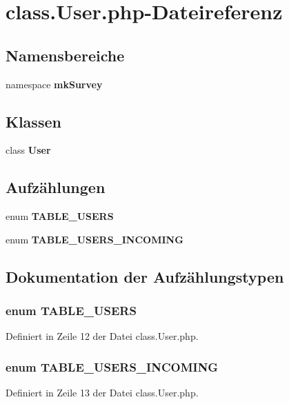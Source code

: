 \section{class.User.php-Dateireferenz}
\label{class_8User_8php}
\subsection*{Namensbereiche}
\begin{CompactItemize}
\item 
namespace {\bf mkSurvey}
\end{CompactItemize}
\subsection*{Klassen}
\begin{CompactItemize}
\item 
class {\bf User}
\end{CompactItemize}
\subsection*{Aufzählungen}
\begin{CompactItemize}
\item 
enum {\bf TABLE\_\-USERS} 
\item 
enum {\bf TABLE\_\-USERS\_\-INCOMING} 
\end{CompactItemize}


\subsection{Dokumentation der Aufzählungstypen}
\subsubsection{\setlength{\rightskip}{0pt plus 5cm}enum {\bf TABLE\_\-USERS}}\label{class_8User_8php_4569193c2d65adce885695208c0bcb1e}




Definiert in Zeile 12 der Datei class.User.php.
\subsubsection{\setlength{\rightskip}{0pt plus 5cm}enum {\bf TABLE\_\-USERS\_\-INCOMING}}\label{class_8User_8php_6dc2f0c5d79da161af45508d0924b14e}




Definiert in Zeile 13 der Datei class.User.php.